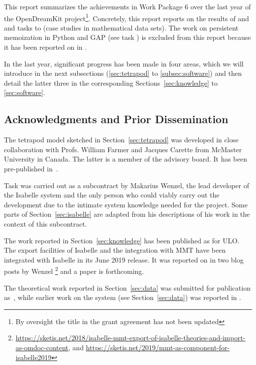 This report summarizes the achievements in Work Package 6 over the last year of the OpenDreamKit project\footnote{By oversight the title in the grant agreement has not been updated}. Concretely, this report reports on the results of  and  and tasks  to  (case studies in mathematical data sets). The work on persistent memoization in Python and GAP (see task ) is excluded from this report because it has been reported on in .

In the last year, significant progress has been made in four areas, which we will introduce in the next subsections (\ref{sec:tetrapod} to \ref{subsec:software}) and then detail the latter three in the corresponding Sections~\ref{sec:knowledge} to \ref{sec:software}.






\subsection{Acknowledgments and Prior Dissemination}
The tetrapod model sketched in Section~\ref{sec:tetrapod} was developed in close collaboration with Profs. William Farmer and Jacques Carette from McMaster University in Canada.
The latter is a member of the \pn advisory board. It has been pre-published in~\cite{CarFarKohRab:bmobb19}.

Task  was carried out as a subcontract by Makarius Wenzel, the lead developer of the Isabelle system and the only person who could viably carry out the development due to the intimate system knowledge needed for the project.
Some parts of Section~\ref{sec:isabelle} are adapted from his descriptions of his work in the context of this subcontract.

The work reported in Section~\ref{sec:knowledge} has been published as \cite{ConKohMue:rdaml19} for ULO.
The export facilities of Isabelle and the integration with MMT have been integrated with Isabelle in its June 2019 release.
It was reported on in two blog posts by Wenzel%
\footnote{\url{https://sketis.net/2018/isabelle-mmt-export-of-isabelle-theories-and-import-as-omdoc-content}, and \url{https://sketis.net/2019/mmt-as-component-for-isabelle2019}}
and a paper is forthcoming.

The theoretical work reported in Section~\ref{sec:data} was submitted for publication as~\cite{CarFarKohRab:bmobb19}, while earlier work on the \dmh system (see Section~\ref{sec:data}) was reported in \cite{BerKohRab:tumdi19}.


